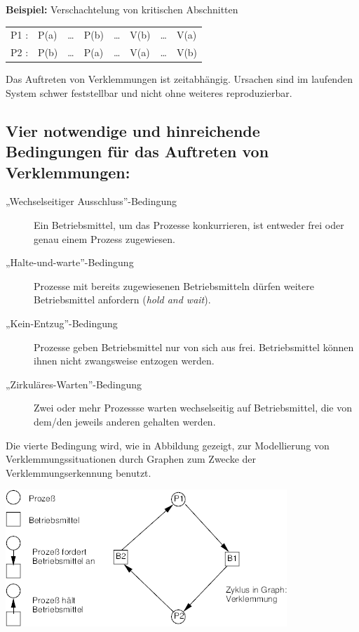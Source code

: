 \documentclass[11pt]{article}
\begin{document}
\textbf{Beispiel:} Verschachtelung von kritischen Abschnitten

\begin{center}
\begin{tabular}{llllllll}
P1 : & P(a) & \ldots{} & P(b) & \ldots{} & V(b) & \ldots{} & V(a)\\
P2 : & P(b) & \ldots{} & P(a) & \ldots{} & V(a) & \ldots{} & V(b)\\
\end{tabular}
\end{center}

Das Auftreten von Verklemmungen ist zeitabhängig. Ursachen sind im
laufenden System schwer feststellbar und nicht ohne weiteres
reproduzierbar.

\subsection*{Vier notwendige und hinreichende Bedingungen für das Auftreten von Verklemmungen:}
\label{sec:orga3688d6}

\begin{description}
\item[{„Wechselseitiger Ausschluss”-Bedingung}] Ein Betriebsmittel, um das Prozesse konkurrieren, ist entweder frei
oder genau einem Prozess zugewiesen.
\item[{„Halte-und-warte”-Bedingung}] Prozesse mit bereits zugewiesenen Betriebsmitteln dürfen weitere
Betriebsmittel anfordern (\emph{hold and wait}).
\item[{„Kein-Entzug”-Bedingung}] Prozesse geben Betriebsmittel nur von sich aus frei. Betriebsmittel
können ihnen nicht zwangsweise entzogen werden.
\item[{„Zirkuläres-Warten”-Bedingung}] Zwei oder mehr Prozessse warten wechselseitig auf Betriebsmittel, die
von dem/den jeweils anderen gehalten werden.
\end{description}

Die vierte Bedingung wird, wie in Abbildung gezeigt, zur
Modellierung von Verklemmungssituationen durch Graphen zum Zwecke der
Verklemmungserkennung benutzt.

\begin{center}
\includegraphics[width=.9\linewidth]{./Abbildungen/deadlock.png}
\end{center}
\end{document}
